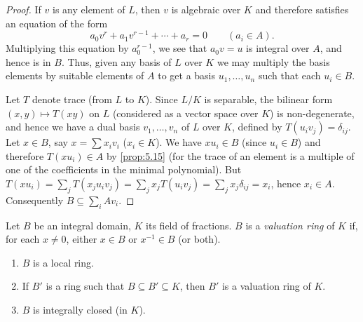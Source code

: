 \begin{proof}
If $v$ is any element of $L$, then $v$ is algebraic over $K$ and therefore satisfies an equation of the form
\[
a_0 v^r + a_1 v^{r-1} + \cdots + a_r = 0 \qquad (a_i \in A).
\]
Multiplying this equation by $a_0^{r-1}$, we see that $a_0 v = u$ is integral over $A$, and hence is in $B$. Thus, given any basis of $L$ over $K$ we may multiply the basis elements by suitable elements of $A$ to get a basis $u_1, \ldots, u_n$ such that each $u_i \in B$.

Let $T$ denote trace (from $L$ to $K$). Since $L/K$ is separable, the bilinear form $(x, y) \mapsto T(xy)$ on $L$ (considered as a vector space over $K$) is non-degenerate, and hence we have a dual basis $v_1, \ldots, v_n$ of $L$ over $K$, defined by $T(u_i v_j) = \delta_{ij}$. Let $x \in B$, say $x = \sum x_i v_i$ ($x_i \in K$). We have $x u_i \in B$ (since $u_i \in B$) and therefore $T(x u_i) \in A$ by \eqref{prop:5.15} (for the trace of an element is a multiple of one of the coefficients in the minimal polynomial). But $T(x u_i) = \sum_j T(x_j u_i v_j) = \sum_j x_j T(u_i v_j) = \sum_j x_j \delta_{ij} = x_i$, hence $x_i \in A$. Consequently $B \subseteq \sum_i A v_i$.
\end{proof}


Let $B$ be an integral domain, $K$ its field of fractions. $B$ is a \emph{valuation ring} of $K$ if, for each $x \neq 0$, either $x \in B$ or $x^{-1} \in B$ (or both).

\begin{proposition}\label{prop:5.18}
\begin{enumerate}
    \item[i)] $B$ is a local ring.
    \item[ii)] If $B'$ is a ring such that $B \subseteq B' \subseteq K$, then $B'$ is a valuation ring of $K$.
    \item[iii)] $B$ is integrally closed (in $K$).
\end{enumerate}
\end{proposition}

